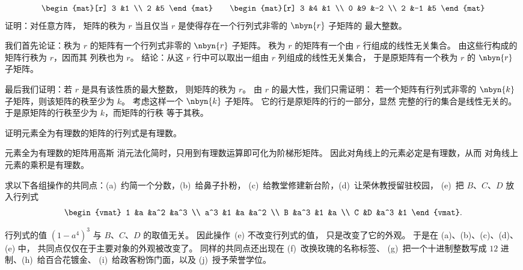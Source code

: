 \begin{exercises}
\begin{equation*}
\begin{mat}[r]
        3  &1  \\
        2  &5
      \end{mat}
      \qquad
      \begin{mat}[r]
        3  &4  &1  \\
        0  &9  &-2 \\
        2  &-1 &5
      \end{mat}
    \end{equation*}
    证明：对任意方阵，
    矩阵的秩为 $r$ 当且仅当
    \( r \) 是使得存在一个行列式非零的
    \( \nbyn{r} \) 子矩阵的
    最大整数。
    \begin{answer}
      我们首先论证：秩为 \( r \) 的矩阵有一个行列式非零的
      \( \nbyn{r} \) 子矩阵。
      秩为 \( r \) 的矩阵有一个由 \( r \) 行组成的线性无关集合。
      由这些行构成的矩阵行秩为 \( r \)，因而其
      列秩也为 \( r \)。
      结论：从这 \( r \) 行中可以取出一组由 \( r \) 列组成的线性无关集合，
      于是原矩阵有一个秩为 \( r \) 的
      \( \nbyn{r} \) 子矩阵。

      最后我们证明：若 \( r \) 是具有该性质的最大整数，
      则矩阵的秩为 \( r \)。
      由 \( r \) 的最大性，我们只需证明：
      若一个矩阵有行列式非零的
      \( \nbyn{k} \) 子矩阵，则该矩阵的秩至少为 \( k \)。
      考虑这样一个 \( \nbyn{k} \) 子矩阵。
      它的行是原矩阵的行的一部分，显然
      完整的行的集合是线性无关的。
      于是原矩阵的行秩至少为 \( k \)，而矩阵的行秩
      等于其秩。  
   \end{answer}
  \item
    证明元素全为有理数的矩阵的行列式是有理数。
    \begin{answer}
      元素全为有理数的矩阵用高斯
      消元法化简时，只用到有理数运算即可化为阶梯形矩阵。
      因此对角线上的元素必定是有理数，从而
      对角线上元素的乘积是有理数。  
    \end{answer}
  \puzzle \item 
     \cite{Monthly53p115}
     求以下各组操作的共同点：(a)~约简一个分数，(b)~给鼻子扑粉，
     (c)~给教堂修建新台阶，(d)~让荣休教授留驻校园，
     (e)~把 \( B \)、\( C \)、\( D \) 放入行列式
     \begin{equation*}
       \begin{vmat}
         1   &a   &a^2  &a^3  \\
         a^3 &1   &a    &a^2  \\
         B   &a^3 &1    &a    \\
         C   &D   &a^3  &1
       \end{vmat}.
     \end{equation*}
     \begin{answer}
       \answerasgiven
       行列式的值 \( (1-a^4)^3 \) 与
       \( B \)、\( C \)、\( D \) 的取值无关。
       因此操作~(e) 不改变行列式的值，
       只是改变了它的外观。
       于是在 (a)、(b)、(c)、(d)、(e) 中，
       共同点仅仅在于主要对象的外观被改变了。
       同样的共同点还出现在 (f)~改换玫瑰的名称标签、
       (g)~把一个十进制整数写成 \( 12 \) 进制、(h)~给百合花镀金、
       (i)~给政客粉饰门面，以及 (j)~授予荣誉学位。
    \end{answer}
\end{exercises}
